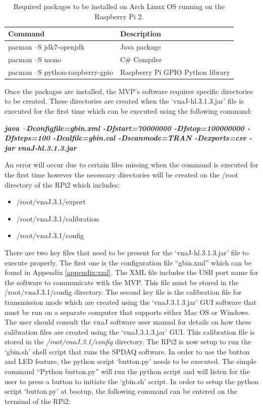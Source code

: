 \begin{table}[h]
\centering
\caption{Required packages to be installed on Arch Linux OS running on the Raspberry Pi 2.}
\label{table:pkg}
\begin{tabular}{|l|l|}
\hline
\textbf{Command}				& \textbf{Description} 				\\ \hline
pacman –S jdk7-openjdk			& Java package 						\\ \hline
pacman –S mono                  & C\# Compiler                     	\\ \hline
pacman –S python-raspberry-gpio & Raspberry Pi GPIO Python library	\\ \hline
\end{tabular}
\end{table}

Once the packages are installed, the MVP’s software requires specific directories to be created. These directories are
created when the ‘vnaJ-hl.3.1.3.jar’ file is executed for the first time which can be executed using the following command:

\noindent
\textbf{\textit{ java –Dconfigfile=gbin.xml -Dfstart=70000000 -Dfstop=100000000 -Dfsteps=100 -Dcalfile=gbin.cal -Dscanmode=TRAN -Dexports=csv -jar vnaJ-hl.3.1.3.jar}}

An error will occur due to certain files missing when the command is executed for the first time however the necessary
directories will be created on the /root directory of the RPi2 which includes:
\begin{itemize}
\item /root/vnaJ.3.1/export
\item /root/vnaJ.3.1/calibration
\item /root/vnaJ.3.1/config
\end{itemize}

There are two key files that need to be present for the ‘vnaJ-hl.3.1.3.jar’ file to execute properly.  The first one is the
configuration file “gbin.xml” which can be found in Appendix \ref{appendix:xml}.  The XML file includes the USB port name for the software to
communicate with the MVP. This file must be stored in the /root/vnaJ.3.1/config directory. The second key file is the
calibration file for transmission mode which are created using the ‘vnaJ.3.1.3.jar’ GUI software that must be run on a
separate computer that supports either Mac OS or Windows.  The user should consult the vnaJ software user manual \cite{vnaj} for
details on how these calibration files are created using the ‘vnaJ.3.1.3.jar’ GUI. This calibration file is stored in the
\noindent
\textit{/root/vnaJ.3.1/config} directory.
\newline
The RPi2 is now setup to run the ‘gbin.sh’ shell script that runs the SPDAQ software.   In order to use the button and LED
feature, the python script ‘button.py’ needs to be executed. The simple command “Python button.py” will run the python script
and will listen for the user to press a button to initiate the ‘gbin.sh’ script.  In order to setup the python script
‘button.py’ at bootup, the following command can be entered on the terminal of the RPi2:

